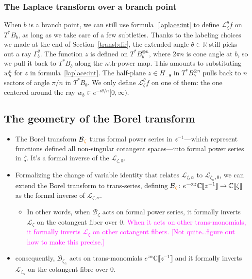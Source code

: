 \documentclass{article}
\theoremstyle{definition}
\newcommand{\maps}{\colon}
\newcommand{\R}{\mathbb{R}}
\newcommand{\C}{\mathbb{C}}
\newcommand{\laplace}{\mathcal{L}}
\newcommand{\borel}{\mathcal{B}}
\begin{document}
\subsubsection{The Laplace transform over a branch point}
When $b$ is a branch point, we can still use formula~\ref{laplace:int} to define $\laplace_\zeta^\theta f$ on $T^*B_b$, as long as we take care of a few subtleties. Thanks to the labeling choices we made at the end of Section~\ref{transl:dir}, the extended angle $\theta \in \R$ still picks out a ray $\Gamma_b^\theta$. The function $z$ is defined on $T^*B_b^{\otimes n}$, where $2\pi n$ is cone angle at $b$, so we pull it back to $T^*B_b$ along the $n$th-power map. This amounts to substituting $w_b^n$ for $z$ in formula~\ref{laplace:int}. The half-plane $z \in H_{-\theta}$ in $T^*B_b^{\otimes n}$ pulls back to $n$ sectors of angle $\pi/n$ in $T^*B_b$. We only define $\laplace_\zeta^\theta f$ on one of them: the one centered around the ray $w_b \in e^{-i\theta/n}[0, \infty)$.

\subsection{The geometry of the Borel transform}
\begin{itemize}
  \item The Borel transform $\borel\textcolor{orange}{_\zeta}$ turns formal power series in $z^{-1}$---which represent functions defined all non-singular cotangent spaces---into formal power series in $\zeta$. It's a formal inverse of the $\laplace_{\zeta, 0}$.
  \item Formalizing the change of variable identity that relates $\laplace_{\zeta, \alpha}$ to $\laplace_{\zeta_\alpha, 0}$, we can extend the Borel transform to trans-series, defining $\borel\textcolor{orange}{_\zeta} \maps e^{-\alpha z} \C\llbracket z^{-1} \rrbracket \to \C\llbracket \zeta \rrbracket$ as the formal inverse of $\laplace_{\zeta, \alpha}$.
  \begin{itemize}
    \item In other words, when $\borel_\zeta$ acts on formal power series, it formally inverts $\laplace_\zeta$ on the cotangent fiber over $0$. \textcolor{magenta}{When it acts on other trans-monomials, it formally inverts $\laplace_\zeta$ on other cotangent fibers. [Not quite\ldots figure out how to make this precise.] }
  \end{itemize}
  \item consequently, $\borel_{\zeta_\alpha}$ acts on trans-monomials $e^{z\alpha}\C\llbracket z^{-1}\rrbracket$ and it formally inverts $\laplace_{\zeta_\alpha}$ on the cotangent fibre over $0$. 
\end{itemize}
\end{document}
